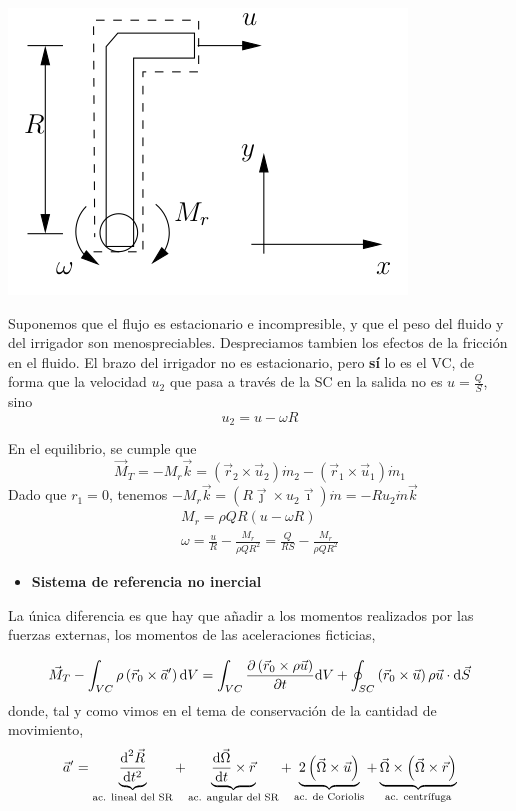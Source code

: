 		\begin{center}
			\includegraphics[width=0.5\linewidth]{TeX_files/chapter04-Dinamica/ejemplo2CMC}
		\end{center}
		
	

		Suponemos que el flujo es estacionario e incompresible, y que el peso
		del fluido y del irrigador son menospreciables. Despreciamos tambien
		los efectos de la fricción en el fluido. El brazo del irrigador no
		es estacionario, pero \textbf{sí} lo es el VC, de forma que la velocidad
		$u_{2}$ que pasa a través de la SC en la salida no es $u=\frac{Q}{S}$,
		sino 
		\[
		u_{2}=u-\omega R
		\]
		
		En el equilibrio, se cumple que 
		\[
		\vec{M}_{T}=-M_{r}\vec{k}=\left(\vec{r}_{2}\times\vec{u}_{2}\right)\dot{m}_{2}-\left(\vec{r}_{1}\times\vec{u}_{1}\right)\dot{m}_{1}
		\]
		Dado que $r_{1}=0$, tenemos $-M_{r}\vec{k}=\left(R\vec{\jmath}\times u_{2}\vec{\imath}\right)\dot{m}=-Ru_{2}\dot{m}\vec{k}$
		\begin{align*}
			M_{r}=\rho QR\left(u-\omega R\right)\\
			\omega=\frac{u}{R}-\frac{M_{r}}{\rho QR^{2}}=\frac{Q}{RS}-\frac{M_{r}}{\rho QR^{2}}
		\end{align*}

	
	\begin{itemize}
		\item \textbf{Sistema de referencia no inercial}
	\end{itemize}
	La única diferencia es que hay que añadir a los momentos realizados
	por las fuerzas externas, los momentos de las aceleraciones ficticias,
	
	\[
	\vec{M}_{T}-\int_{VC}\rho\left(\vec{r}_{0}\times\vec{a}'\right)\text{d} V=\int_{VC}\frac{\partial \left(\vec{r}_{0}\times\rho\vec{u}\right)}{\partial t}\text{d} V+\oint_{SC}\left(\vec{r}_{0}\times\vec{u}\right)\rho\vec{u}\cdot\text{d}\vec{S}
	\]
	donde, tal y como vimos en el tema de conservación de la cantidad
	de movimiento, 
	\[
	\vec{a}'=\underbrace{\frac{\text{d}^{2}\vec{R}}{\text{d}t^{2}}}_{\text{ac. lineal del SR}}+\underbrace{\frac{\textrm{d} \vec{\Omega}}{\textrm{d} t}\times\vec{r}}_{\text{ac. angular del SR}}+\underbrace{2\left(\vec{\Omega}\times\vec{u}\right)}_{\text{ac. de Coriolis}}+\underbrace{\vec{\Omega}\times\left(\vec{\Omega}\times\vec{r}\right)}_{\text{ac. centr\'ifuga}}
	\]
	
